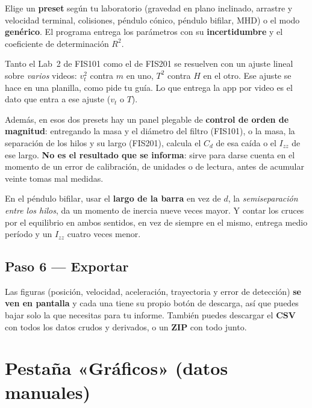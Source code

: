 \documentclass[11pt,a4paper]{article}
\begin{document}
Elige un \textbf{preset} según tu laboratorio (gravedad en plano inclinado,
arrastre y velocidad terminal, colisiones, péndulo cónico, péndulo bifilar, MHD)
o el modo \textbf{genérico}. El programa entrega los parámetros con su
\textbf{incertidumbre} y el coeficiente de determinación $R^{2}$.

\begin{obs}
  Tanto el Lab~2 de FIS101 como el de FIS201 se resuelven con un ajuste lineal
  sobre \emph{varios} videos: $v_t^{2}$ contra $m$ en uno, $T^{2}$ contra $H$ en
  el otro. Ese ajuste se hace en una planilla, como pide tu guía. Lo que
  entrega la app por video es el dato que entra a ese ajuste ($v_t$ o $T$).
\end{obs}

Además, en esos dos presets hay un panel plegable de \textbf{control de orden de
magnitud}: entregando la masa y el diámetro del filtro (FIS101), o la masa, la
separación de los hilos y su largo (FIS201), calcula el $C_d$ de esa caída o el
$I_{zz}$ de ese largo. \textbf{No es el resultado que se informa}: sirve para
darse cuenta en el momento de un error de calibración, de unidades o de lectura,
antes de acumular veinte tomas mal medidas.

\begin{errcomun}
  En el péndulo bifilar, usar el \textbf{largo de la barra} en vez de $d$, la
  \emph{semiseparación entre los hilos}, da un momento de inercia nueve veces
  mayor. Y contar los cruces por el equilibrio en ambos sentidos, en vez de
  siempre en el mismo, entrega medio período y un $I_{zz}$ cuatro veces menor.
\end{errcomun}

\subsection{Paso 6 — Exportar}

Las figuras (posición, velocidad, aceleración, trayectoria y error de detección)
\textbf{se ven en pantalla} y cada una tiene su propio botón de descarga, así que
puedes bajar solo la que necesitas para tu informe. También puedes descargar el
\textbf{CSV} con todos los datos crudos y derivados, o un \textbf{ZIP} con todo
junto.

\section{Pestaña «Gráficos» (datos manuales)}
\end{document}

